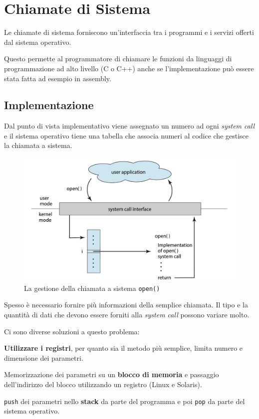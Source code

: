 \section{Chiamate di Sistema}
Le chiamate di sistema forniscono un'interfaccia tra i programmi e i servizi offerti dal sistema operativo.

Questo permette al programmatore di chiamare le funzioni da linguaggi di programmazione ad alto livello (C o C++) anche se l'implementazione può essere stata fatta ad esempio in assembly.

\subsection{Implementazione}
Dal punto di vista implementativo viene assegnato un numero ad ogni \textit{system call} e il sistema operativo tiene una tabella che associa numeri al codice che gestisce la chiamata a sistema.

\begin{figure}[H]
    \centering
    \includegraphics[width=0.65\linewidth]{assets/systemcall.jpg}
    \caption{La gestione della chiamata a sistema \texttt{open()}}
\end{figure}

Spesso è necessario fornire più informazioni della semplice chiamata. Il tipo e la quantità di dati che devono essere forniti alla \textit{system call} possono variare molto.

\spacer
Ci sono diverse soluzioni a questo problema:
\begin{sitemize}
    \item \textbf{Utilizzare i registri}, per quanto sia il metodo più semplice, limita numero e dimensione dei parametri.
    \item Memorizzazione dei parametri su un \textbf{blocco di memoria} e passaggio dell'indirizzo del blocco utilizzando un registro (Linux e Solaris).
    \item \texttt{push} dei parametri nello \textbf{stack} da parte del programma e poi \texttt{pop} da parte del sistema operativo.
\end{sitemize}

